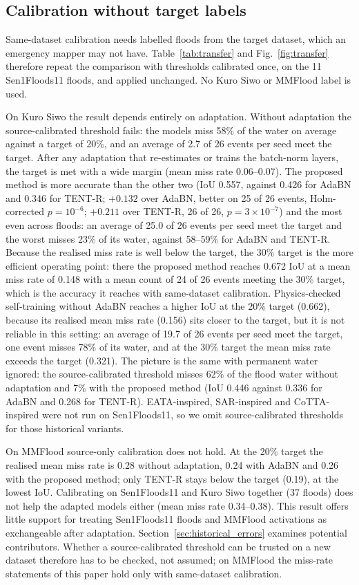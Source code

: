 \subsection{Calibration without target labels}
\label{sec:transfer}
Same-dataset calibration needs labelled floods from the target dataset, which an emergency mapper may not have. Table~\ref{tab:transfer} and Fig.~\ref{fig:transfer} therefore repeat the comparison with thresholds calibrated once, on the 11 Sen1Floods11 floods, and applied unchanged. No Kuro Siwo or MMFlood label is used.

On Kuro Siwo the result depends entirely on adaptation. Without adaptation the source-calibrated threshold fails: the models miss 58\% of the water on average against a target of 20\%, and an average of 2.7 of 26 events per seed meet the target. After any adaptation that re-estimates or trains the batch-norm layers, the target is met with a wide margin (mean miss rate 0.06--0.07). The proposed method is more accurate than the other two (IoU 0.557, against 0.426 for AdaBN and 0.346 for TENT-R; $+0.132$ over AdaBN, better on 25 of 26 events, Holm-corrected $p=10^{-6}$; $+0.211$ over TENT-R, 26 of 26, $p=3\times10^{-7}$) and the most even across floods: an average of 25.0 of 26 events per seed meet the target and the worst misses 23\% of its water, against 58--59\% for AdaBN and TENT-R. Because the realised miss rate is well below the target, the 30\% target is the more efficient operating point: there the proposed method reaches 0.672 IoU at a mean miss rate of 0.148 with a mean count of 24 of 26 events meeting the 30\% target, which is the accuracy it reaches with same-dataset calibration. Physics-checked self-training without AdaBN reaches a higher IoU at the 20\% target (0.662), because its realised mean miss rate (0.156) sits closer to the target, but it is not reliable in this setting: an average of 19.7 of 26 events per seed meet the target, one event misses 78\% of its water, and at the 30\% target the mean miss rate exceeds the target (0.321). The picture is the same with permanent water ignored: the source-calibrated threshold misses 62\% of the flood water without adaptation and 7\% with the proposed method (IoU 0.446 against 0.336 for AdaBN and 0.268 for TENT-R). EATA-inspired, SAR-inspired and CoTTA-inspired were not run on Sen1Floods11, so we omit source-calibrated thresholds for those historical variants.

On MMFlood source-only calibration does not hold. At the 20\% target the realised mean miss rate is 0.28 without adaptation, 0.24 with AdaBN and 0.26 with the proposed method; only TENT-R stays below the target (0.19), at the lowest IoU. Calibrating on Sen1Floods11 and Kuro Siwo together (37 floods) does not help the adapted models either (mean miss rate 0.34--0.38). This result offers little support for treating Sen1Floods11 floods and MMFlood activations as exchangeable after adaptation. Section~\ref{sec:historical_errors} examines potential contributors. Whether a source-calibrated threshold can be trusted on a new dataset therefore has to be checked, not assumed; on MMFlood the miss-rate statements of this paper hold only with same-dataset calibration.

